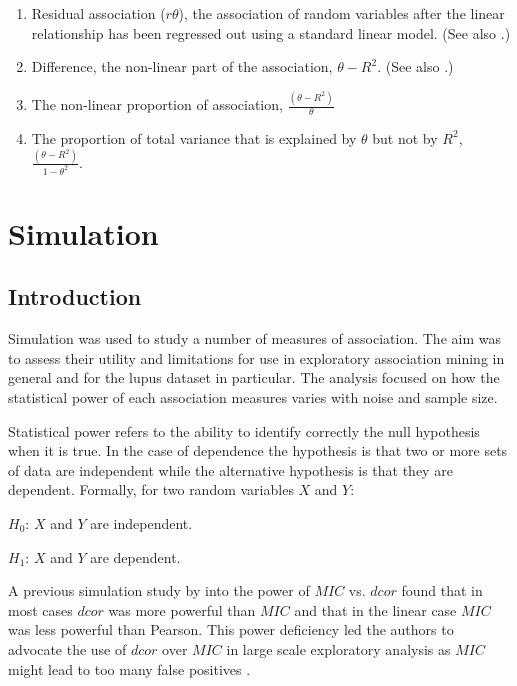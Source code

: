 \documentclass[a4paper, 12pt]{report}
\begin{document}
\begin{enumerate}
\item Residual association ($r \theta$), the association of random variables after the linear relationship has been regressed out using a standard linear model. (See also \citet{energy2013}.) %
\item Difference, the non-linear part of the association, $\theta - R^2$. (See also \citet{mic2011}.)
\item The non-linear proportion of association, $\frac{(\theta-R^2)}{\theta}$
\item The proportion of total variance that is explained by $\theta$ but not by $R^2$, $\frac{(\theta-R^2)}{1 -\theta^2}$.
\end{enumerate}

\chapter{Simulation}

\section{Introduction}
Simulation was used to study a number of measures of association. The aim was to assess their utility and limitations for use in exploratory association mining in general and for the lupus dataset in particular. The analysis focused on how the statistical power of each association measures varies with noise and sample size.

Statistical power refers to the ability to identify correctly the null hypothesis when it is true. In the case of dependence the hypothesis is that two or more sets of data are independent while the alternative hypothesis is that they are dependent. Formally, for two random variables $X$ and $Y$: 
 \newline

$H_0$: $X$ and $Y$ are independent.

$H_1$: $X$ and $Y$ are dependent.
\newline

A previous simulation study by \citet{Tibshirani2011} into the power of $MIC$ vs. $dcor$ found that in most cases $dcor$ was more powerful than $MIC$ and that in the linear case $MIC$ was less powerful than \gls{Pearson}. This power deficiency led the authors to advocate the use of $dcor$ over $MIC$ in large scale exploratory analysis as $MIC$ might lead to too many false positives \cite{Tibshirani2011}. 
\end{document}
